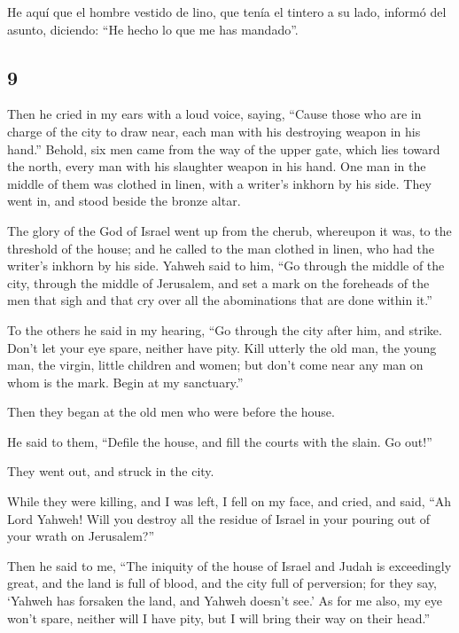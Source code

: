\begin{paracol}{2}
 He aquí que el hombre vestido de lino, que tenía el
tintero a su lado, informó del asunto, diciendo: ``He hecho lo que me
has mandado''.

\switchcolumn
\begin{otherlanguage}{english}

\hypertarget{section-17}{%
\section{9}\label{section-17}}

 Then he cried in my ears with a loud voice, saying,
``Cause those who are in charge of the city to draw near, each man with
his destroying weapon in his hand.''  Behold, six men came
from the way of the upper gate, which lies toward the north, every man
with his slaughter weapon in his hand. One man in the middle of them was
clothed in linen, with a writer's inkhorn by his side. They went in, and
stood beside the bronze altar.

 The glory of the God of Israel went up from the cherub,
whereupon it was, to the threshold of the house; and he called to the
man clothed in linen, who had the writer's inkhorn by his side.
 Yahweh said to him, ``Go through the middle of the city,
through the middle of Jerusalem, and set a mark on the foreheads of the
men that sigh and that cry over all the abominations that are done
within it.''

 To the others he said in my hearing, ``Go through the
city after him, and strike. Don't let your eye spare, neither have pity.
 Kill utterly the old man, the young man, the virgin,
little children and women; but don't come near any man on whom is the
mark. Begin at my sanctuary.''

Then they began at the old men who were before the house.

 He said to them, ``Defile the house, and fill the courts
with the slain. Go out!''

They went out, and struck in the city.

 While they were killing, and I was left, I fell on my
face, and cried, and said, ``Ah Lord Yahweh! Will you destroy all the
residue of Israel in your pouring out of your wrath on Jerusalem?''

 Then he said to me, ``The iniquity of the house of Israel
and Judah is exceedingly great, and the land is full of blood, and the
city full of perversion; for they say, `Yahweh has forsaken the land,
and Yahweh doesn't see.'  As for me also, my eye won't
spare, neither will I have pity, but I will bring their way on their
head.''


\end{otherlanguage}
\end{paracol}
